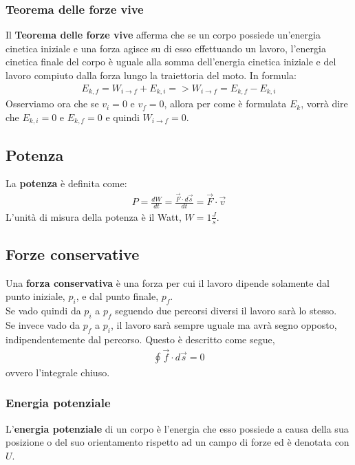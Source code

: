         \subsubsection{Teorema delle forze vive}
            Il \textbf{Teorema delle forze vive} afferma che se un corpo possiede un'energia cinetica iniziale e una forza agisce su di esso effettuando un lavoro, l'energia cinetica finale del corpo è uguale alla somma dell'energia cinetica iniziale e del lavoro compiuto dalla forza lungo la traiettoria del moto. In formula:
            \begin{align*}
                E_{k,f}=W_{i\rightarrow f}+E_{k,i}=>W_{i\rightarrow f}=E_{k,f}-E_{k,i}
            \end{align*}
            Osserviamo ora che se $v_i=0$ e $v_f=0$, allora per come è formulata $E_k$, vorrà dire che $E_{k,i}=0$ e $E_{k,f}=0$ e quindi $W_{i\rightarrow f}=0$.

    \subsection{Potenza}
        La \textbf{potenza} è definita come:
        \begin{align*}
            P=\frac{dW}{dt}=\frac{\vec{F}\cdot d\vec{s}}{dt}=\vec{F}\cdot\vec{v}
        \end{align*}
        L'unità di misura della potenza è il Watt, $W=1\frac{J}{s}$.

    \subsection{Forze conservative}
        Una \textbf{forza conservativa} è una forza per cui il lavoro dipende solamente dal punto iniziale, $p_i$, e dal punto finale, $p_f$.\\
        Se vado quindi da $p_i$ a $p_f$ seguendo due percorsi diversi il lavoro sarà lo stesso.\\
        Se invece vado da $p_f$ a $p_i$, il lavoro sarà sempre uguale ma avrà segno opposto, indipendentemente dal percorso. Questo è descritto come segue,
        \begin{align*}
            \oint \vec{f}\cdot d\vec{s}=0
        \end{align*}
        ovvero l'integrale chiuso.

        \subsubsection{Energia potenziale}
            L'\textbf{energia potenziale} di un corpo è l'energia che esso possiede a causa della sua posizione o del suo orientamento rispetto ad un campo di forze ed è denotata con $U$.

